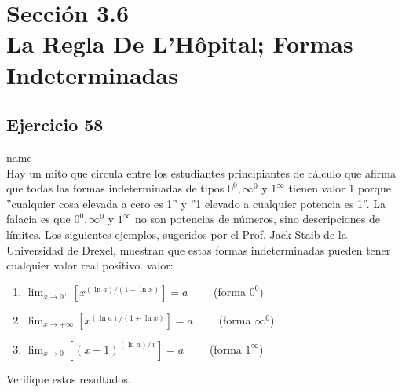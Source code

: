 \documentclass[12pt]{article}
\begin{document}
\section{Sección 3.6 \\ La Regla De L'Hôpital; Formas Indeterminadas} 
\subsection{Ejercicio 58} name \\

Hay un mito que circula entre los estudiantes principiantes de cálculo que afirma que todas las formas indeterminadas de tipos $0^0,\infty^0$ y $1^{\infty}$ tienen valor 1 porque ''cualquier cosa elevada a cero es 1'' y ''1 elevado a cualquier potencia es 1''. La falacia es que $0^0,\infty^0$ y $1^{\infty}$ no son potencias de números, sino descripciones de límites. Los siguientes ejemplos, sugeridos por el Prof. Jack Staib de la Universidad de Drexel, muestran que estas formas indeterminadas pueden tener cualquier valor real positivo.
valor:
\begin{enumerate}[label=(\alph*)]
\item $\lim_{x \to 0^+} [x^{(\ln a)/(1+\ln x)}]=a \qquad$ (forma $0^0$)
\item $\lim_{x \to +\infty} [x^{(\ln a)/(1+\ln x)}]=a \qquad$ (forma $\infty^0$)
\item $\lim_{x \to 0} [(x+1)^{(\ln a)/x}]=a \qquad$ (forma $1^{\infty}$)
\end{enumerate}
Verifique estos resultados.
\end{document}
